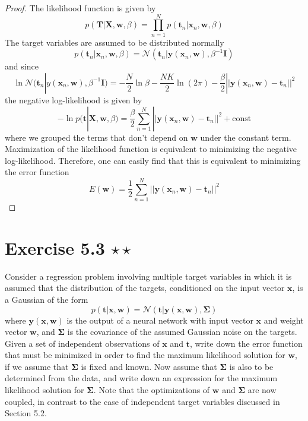 \vspace{1em}

\begin{proof}
    The likelihood function is given by 
    \[
        p(\mathbf{T} | \mathbf{X}, \mathbf{w}, \beta)
        = \prod_{n = 1}^N p(\mathbf{t}_n | \mathbf{x}_n, \mathbf{w}, \beta)
    \] 
    The target variables are assumed to be distributed normally
    \begin{equation}\label{eq:5.16}\tag{5.16}
        p(\mathbf{t}_n | \mathbf{x}_n, \mathbf{w}, \beta) 
        = \mathcal{N}(\mathbf{t}_n | \mathbf{y}(\mathbf{x}_n, \mathbf{w}), \beta^{-1}\mathbf{I})
    \end{equation}
    and since
    \[
        \ln \mathcal{N}(\mathbf{t}_n | y(\mathbf{x}_n, \mathbf{w}), \beta^{-1}\mathbf{I})
        = -\frac{N}{2} \ln \beta - \frac{NK}{2} \ln(2\pi) - \frac{\beta}{2} 
        ||\mathbf{y}(\mathbf{x}_n, \mathbf{w}) - \mathbf{t}_n||^2
    \] 
    the negative log-likelihood is given by
    \[
        -\ln p(\mathbf{t} | \mathbf{X}, \mathbf{w}, \beta)
        = \frac{\beta}{2}\sum_{n=1}^{N} 
        ||\mathbf{y}(\mathbf{x}_n, \mathbf{w}) - \mathbf{t}_n||^2 + \text{const}
    \] 
    where we grouped the terms that don't depend on $\mathbf{w}$ under the constant term.
    Maximization of the likelihood function is equivalent to minimizing the negative 
    log-likelihood.
    Therefore, one can easily find that this is equivalent to minimizing the error function
    \begin{equation}\label{eq:5.11}\tag{5.11}
        E(\mathbf{w}) = \frac{1}{2} \sum_{n=1}^{N} 
        ||\mathbf{y}(\mathbf{x}_n, \mathbf{w}) - \mathbf{t}_n||^2
    \end{equation}
\end{proof}

\section*{Exercise 5.3 $\star \star$}
Consider a regression problem involving multiple target variables in which
it is assumed that the distribution of the targets, conditioned on the input
vector $\mathbf{x}$, is a Gaussian of the form
\begin{equation}\label{eq:5.192}\tag{5.192}
    p(\mathbf{t} | \mathbf{x}, \mathbf{w}) 
    = \mathcal{N}(\mathbf{t} | \mathbf{y}(\mathbf{x}, \mathbf{w}), \mathbf{\Sigma})
\end{equation}
where $\mathbf{y(x, w)}$ is the output of a neural network with input vector
$\mathbf{x}$ and weight vector $\mathbf{w}$, and $ \mathbf{\Sigma}$ is the
covariance of the assumed Gaussian noise on the targets. Given a set
of independent observations of $\mathbf{x}$ and $\mathbf{t}$, write down
the error function that must be minimized in order to find the maximum
likelihood solution for $\mathbf{w}$, if we assume that $ \mathbf{\Sigma}$
is fixed and known. Now assume that $ \mathbf{\Sigma}$ is also to be determined
from the data, and write down an expression for the maximum likelihood
solution for $ \mathbf{\Sigma}$. Note that the optimizations of
$\mathbf{w}$ and $\mathbf{\Sigma}$ are now coupled, in contrast to the
case of independent target variables discussed in Section 5.2.

